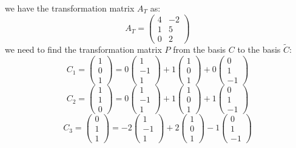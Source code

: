 \documentclass[a3paper,12pt]{extarticle} %
\begin{document}
\begin{enumerate}
\begin{enumerate}
        we have the transformation matrix \( A_T \) as:
        \[
            A_T = \begin{pmatrix} 4 & -2 \\ 1 & 5 \\ 0 & 2 \end{pmatrix}
        \]
         we need to find the transformation matrix \( P \) from the basis \( C \) to the basis \( \tilde{C} \):
        \[
            C_1 = \begin{pmatrix} 1 \\ 0 \\ 1 \end{pmatrix} = 0 \begin{pmatrix} 1 \\ -1 \\ 1 \end{pmatrix} + 1 \begin{pmatrix} 1 \\ 0 \\ 1 \end{pmatrix} + 0 \begin{pmatrix} 0 \\ 1 \\ -1 \end{pmatrix}    
        \]
        \[
            C_2 = \begin{pmatrix} 1 \\ 1 \\ 0 \end{pmatrix} = 0 \begin{pmatrix} 1 \\ -1 \\ 1 \end{pmatrix} + 1 \begin{pmatrix} 1 \\ 0 \\ 1 \end{pmatrix} + 1 \begin{pmatrix} 0 \\ 1 \\ -1 \end{pmatrix}
        \]
        \[
            C_3 = \begin{pmatrix} 0 \\ 1 \\ 1 \end{pmatrix} = -2 \begin{pmatrix} 1 \\ -1 \\ 1 \end{pmatrix} + 2 \begin{pmatrix} 1 \\ 0 \\ 1 \end{pmatrix} -1 \begin{pmatrix} 0 \\ 1 \\ -1 \end{pmatrix}
\]
\end{enumerate}
\end{enumerate}
\end{document}
